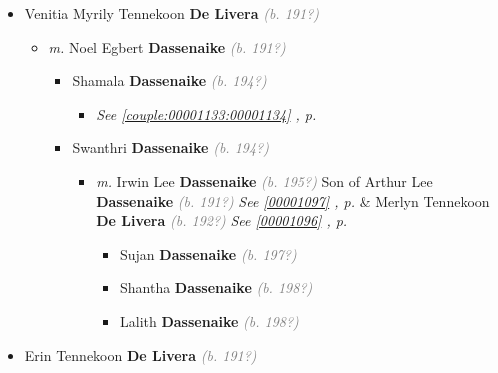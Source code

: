 \documentclass[10pt, openany]{book}
\begin{document}
\begin{itemize}
{\begin{itemize}
{\begin{itemize}
{\begin{itemize}
{\begin{itemize}
\end{itemize}
  }
\end{itemize}}
\end{itemize}
     }
\item{Venitia Myrily Tennekoon \textbf{De Livera} \textcolor{gray}{\textit{(b. 191?)}}
\begin{itemize}
\item{\textit{m.} Noel Egbert \textbf{Dassenaike} \textcolor{gray}{\textit{(b. 191?)}}   \label{couple:00001131:00001132} \begin{itemize}
\item{Shamala \textbf{Dassenaike} \textcolor{gray}{\textit{(b. 194?)}}
\begin{itemize}
\item{\textcolor{slteal}{\textit{See  \autoref{couple:00001133:00001134} \textit{, p. \pageref{couple:00001133:00001134} }}}}
\end{itemize}
 }
\item{Swanthri \textbf{Dassenaike} \textcolor{gray}{\textit{(b. 194?)}}
\begin{itemize}
\item{\textit{m.} Irwin Lee \textbf{Dassenaike} \textcolor{gray}{\textit{(b. 195?)}} Son of  Arthur Lee \textbf{Dassenaike} \textcolor{gray}{\textit{(b. 191?)}} \textcolor{slteal}{\textit{See  \autoref{00001097} \textit{, p. \pageref{00001097} }}}  \&  Merlyn Tennekoon \textbf{De Livera} \textcolor{gray}{\textit{(b. 192?)}} \textcolor{slteal}{\textit{See  \autoref{00001096} \textit{, p. \pageref{00001096} }}}   \label{couple:00001098:00001099} \begin{itemize}
\item{Sujan \textbf{Dassenaike} \textcolor{gray}{\textit{(b. 197?)}}
 }
\item{Shantha \textbf{Dassenaike} \textcolor{gray}{\textit{(b. 198?)}}
 }
\item{Lalith \textbf{Dassenaike} \textcolor{gray}{\textit{(b. 198?)}}
 }
\end{itemize}}
\end{itemize}
 }
\end{itemize}}
\end{itemize}
    }
\item{Erin Tennekoon \textbf{De Livera} \textcolor{gray}{\textit{(b. 191?)}}
}
\end{itemize}}
\end{itemize}
\end{document}
